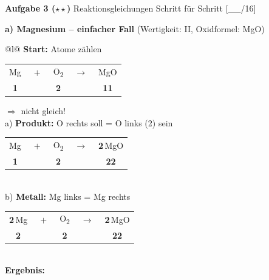 \documentclass[10pt, a4paper]{article}
\newcommand{\lsg}[1]{\textcolor{loesung}{\textbf{#1}}}
\newcommand{\punktebox}[1]{\hfill\small\textcolor{mittelgrau}{[\_\_/#1]}}
\newcommand{\aufgabe}[2]{%
    \vspace{6pt}%
    \noindent\textbf{\textcolor{fachfarbe}{Aufgabe #1}} #2%
    \vspace{3pt}%
    \nopagebreak[4]%
}
\begin{document}
\aufgabe{3 ($\star\star$)}{Reaktionsgleichungen Schritt für Schritt} \punktebox{16}

\small

\textbf{a) Magnesium – einfacher Fall} (Wertigkeit: II, Oxidformel: MgO)

\begin{tabular}{@{}l@{}}
\textbf{Start:} Atome zählen \\[0.3em]
\hspace{1em}\begin{tabular}[t]{@{}c@{}c@{}c@{}c@{}c@{}}
Mg & $\;+\;$ & O\textsubscript{2} & $\;\rightarrow\;$ & MgO \\[-0.2em]
{\scriptsize\textcolor{metall}{\textbf{1}}} & & {\scriptsize\textcolor{sauerstoff}{\textbf{2}}} & & {\scriptsize\textcolor{metall}{\textbf{1}}\hspace{0.5em}\textcolor{sauerstoff}{\textbf{1}}}
\end{tabular} \quad $\Rightarrow$ nicht gleich! \\[0.8em]
%
a) \textbf{Produkt:} O rechts soll = O links (2) sein \\[0.3em]
\hspace{1em}\begin{tabular}[t]{@{}c@{}c@{}c@{}c@{}c@{}}
Mg & $\;+\;$ & O\textsubscript{2} & $\;\rightarrow\;$ & \lsg{2}\,MgO \\[-0.2em]
{\scriptsize\textcolor{metall}{\textbf{1}}} & & {\scriptsize\textcolor{sauerstoff}{\textbf{2}}} & & {\scriptsize\textcolor{metall}{\textbf{2}}\hspace{0.5em}\textcolor{sauerstoff}{\textbf{2}}}
\end{tabular} \\[0.8em]
%
b) \textbf{Metall:} Mg links = Mg rechts \\[0.3em]
\hspace{1em}\begin{tabular}[t]{@{}c@{}c@{}c@{}c@{}c@{}}
\lsg{2}\,Mg & $\;+\;$ & O\textsubscript{2} & $\;\rightarrow\;$ & \lsg{2}\,MgO \\[-0.2em]
{\scriptsize\textcolor{metall}{\textbf{2}}} & & {\scriptsize\textcolor{sauerstoff}{\textbf{2}}} & & {\scriptsize\textcolor{metall}{\textbf{2}}\hspace{0.5em}\textcolor{sauerstoff}{\textbf{2}}}
\end{tabular} \\[0.6em]
%
\textbf{Ergebnis:} \fbox{\lsg{2} Mg + \lsg{1} O\textsubscript{2} $\rightarrow$ \lsg{2} MgO} \\
\end{tabular}
\end{document}
